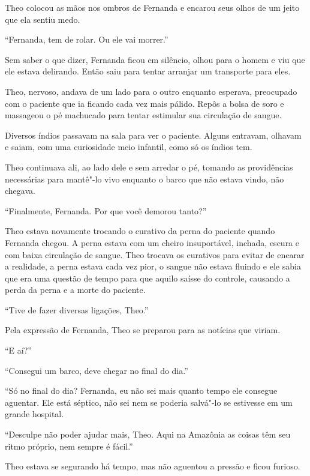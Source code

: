 Theo colocou as mãos nos ombros de Fernanda e encarou seus olhos de um
jeito que ela sentiu medo.

``Fernanda, tem de rolar. Ou ele vai morrer.''

Sem saber o que dizer, Fernanda ficou em silêncio, olhou para o homem e
viu que ele estava delirando. Então saiu para tentar arranjar um
transporte para eles.

Theo, nervoso, andava de um lado para o outro enquanto esperava,
preocupado com o paciente que ia ficando cada vez mais pálido. Repôs a
bolsa de soro e massageou o pé machucado para tentar estimular sua
circulação de sangue.

Diversos índios passavam na sala
para ver o paciente. Alguns entravam, olhavam e saiam, com uma
curiosidade meio infantil, como só os índios tem.

Theo continuava ali, ao lado dele e sem
arredar o pé, tomando as providências necessárias para mantê"-lo vivo
enquanto o barco que não estava vindo, não chegava.

\asterisc


``Finalmente, Fernanda. Por que você demorou tanto?''

Theo estava novamente trocando o curativo da perna do paciente quando
Fernanda chegou. A perna estava com um cheiro insuportável, inchada,
escura e com baixa circulação de sangue. Theo trocava os curativos para
evitar de encarar a realidade, a perna estava cada vez pior, o sangue
não estava fluindo e ele sabia que era uma questão de tempo para que
aquilo saísse do controle, causando a perda da perna e a morte do
paciente.

``Tive de fazer diversas ligações, Theo.''

Pela expressão de Fernanda, Theo se preparou para as notícias que
viriam.

``E aí?''

``Consegui um barco, deve chegar no final do dia.''

``Só no final do dia? Fernanda, eu não sei mais quanto tempo ele
consegue aguentar. Ele está séptico, não sei nem se poderia salvá"-lo se
estivesse em um grande hospital.

``Desculpe não poder ajudar mais, Theo. Aqui na Amazônia as coisas têm
seu ritmo próprio, nem sempre é fácil.''

Theo estava se segurando há tempo, mas não aguentou a pressão e ficou
furioso.

